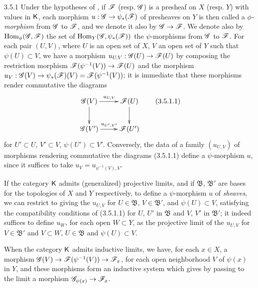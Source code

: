 \begin{env}{3.5.1}
\label{env-0.3.5.1}
Under the hypotheses of , if $\mathscr{F}$ (resp. $\mathscr{G}$) is a
presheaf on $X$ (resp. $Y$) with values in $\mathsf{K}$, each morphism
$u:\mathscr{G}\to\psi_*(\mathscr{F})$ of presheaves on $Y$ is then called a
\emph{$\phi$-morphism} from $\mathscr{G}$ to $\mathscr{F}$, and we denote it also by
$\mathscr{G}\to\mathscr{F}$. We denote also by ${\mathop{\mathrm{Hom}}\nolimits}_\phi(\mathscr{G},\mathscr{F})$ the set of
${\mathop{\mathrm{Hom}}\nolimits}_Y(\mathscr{G},\psi_*(\mathscr{F}))$ the $\psi$-morphisms from $\mathscr{G}$ to $\mathscr{F}$.
For each pair $(U,V)$, where $U$ is an open set of $X$, $V$ an open set of $Y$
such that $\psi(U)\subset V$, we have a morphism $u_{U,V}:\mathscr{G}(U)\to\mathscr{F}(U)$
by composing the restriction morphism $\mathscr{F}(\psi^{-1}(V))\to\mathscr{F}(U)$ and the
morphism $u_V:\mathscr{G}(V)\to\psi_*(\mathscr{F})(V)=\mathscr{F}(\psi^{-1}(V))$; it is
immediate that these morphisms render commutative the diagrams
\[
  \xymatrix{
    \sh{G}(V)\ar[r]^{u_{U,V}}\ar[d] &
    \sh{F}(U)\ar[d]\\
    \sh{G}(V')\ar[r]^{u_{U',V'}} &
    \sh{F}(U')
  }
  \tag{3.5.1.1}
\]
for $U'\subset U$, $V'\subset V$, $\psi(U')\subset V'$. Conversely, the data of
a family $(u_{U,V})$ of morphisms rendering commutative the diagrams (3.5.1.1)
define a $\psi$-morphism $u$, since it suffices to take
$u_V=u_{\psi^{-1}(V),V}$.

If the category $\mathsf{K}$ admits (generalized) projective limits, and if
$\mathfrak{B}$, $\mathfrak{B}'$ are bases for the topologies of $X$ and $Y$
respectively, to define a $\psi$-morphism $u$ of \emph{sheaves}, we can restrict
to giving the $u_{U,V}$ for $U\in\mathfrak{B}$, $V\in\mathfrak{B}'$, and
$\psi(U)\subset V$, satisfying the compatibility conditions of (3.5.1.1) for
$U$, $U'$ in $\mathfrak{B}$ and $V$, $V'$ in $\mathfrak{B}'$; it indeed suffices
to define $u_W$, for each open $W\subset Y$, as the projective limit of the
$u_{U,V}$ for $V\in\mathfrak{B}'$ and $V\subset W$, $U\in\mathfrak{B}$ and
$\psi(U)\subset V$.

When the category $\mathsf{K}$ admits inductive limits, we have, for each $x\in X$, a
morphism $\mathscr{G}(V)\to\mathscr{F}(\psi^{-1}(V))\to\mathscr{F}_x$, for each open
neighborhood $V$ of $\psi(x)$ in $Y$, and these morphisms form an inductive
system which gives by passing to the limit a morphism
$\mathscr{G}_{\psi(x)}\to\mathscr{F}_x$.
\end{env}

